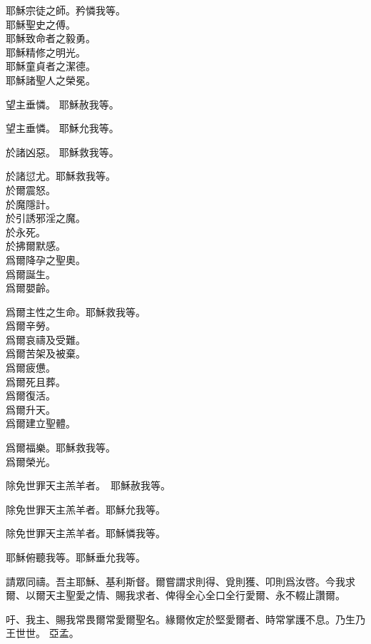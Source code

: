 \versicle 耶穌宗徒之師。\hfill \response 矜憐我等。\\
耶穌聖史之傅。\\
耶穌致命者之毅勇。\\
耶穌精修之明光。\\
耶穌童貞者之潔德。\\
耶穌諸聖人之榮冕。

\versicle 望主垂憐。 \hfill \response 耶穌赦我等。

\versicle 望主垂憐。 \hfill \response 耶穌允我等。

\versicle 於諸凶惡。 \hfill \response 耶穌救我等。

\versicle 於諸愆尤。\hfill \response 耶穌救我等。\\
於爾震怒。\\
於魔隱計。\\
於引誘邪淫之魔。\\
於永死。\\
於拂爾默感。\\
爲爾降孕之聖奧。\\
爲爾誕生。\\
爲爾嬰齡。

\versicle 爲爾主性之生命。\hfill \response 耶穌救我等。\\
爲爾辛勞。\\
爲爾哀禱及受難。\\
爲爾苦架及被棄。\\
爲爾疲憊。\\
爲爾死且葬。\\
爲爾復活。\\
爲爾升天。\\
爲爾建立聖體。

\versicle 爲爾福樂。\hfill \response 耶穌救我等。\\
爲爾榮光。

\versicle 除免世罪天主羔羊者。　\hfill \response 耶穌赦我等。

\versicle 除免世罪天主羔羊者。\hfill \response 耶穌允我等。

\versicle 除免世罪天主羔羊者。\hfill \response 耶穌憐我等。

\versicle 耶穌俯聽我等。\hfill \response 耶穌垂允我等。

\versicle 請眾同禱。{\cspace}吾主耶穌、基利斯督。爾嘗謂求則得、覓則獲、叩則爲汝啓。今我求爾、以爾天主聖愛之情、賜我求者、俾得全心全口全行愛爾、永不輟止讚爾。

吁、我主、賜我常畏爾常愛爾聖名。緣爾攸定於堅愛爾者、時常掌護不息。乃生乃王世世。 {\cspace}亞孟。

